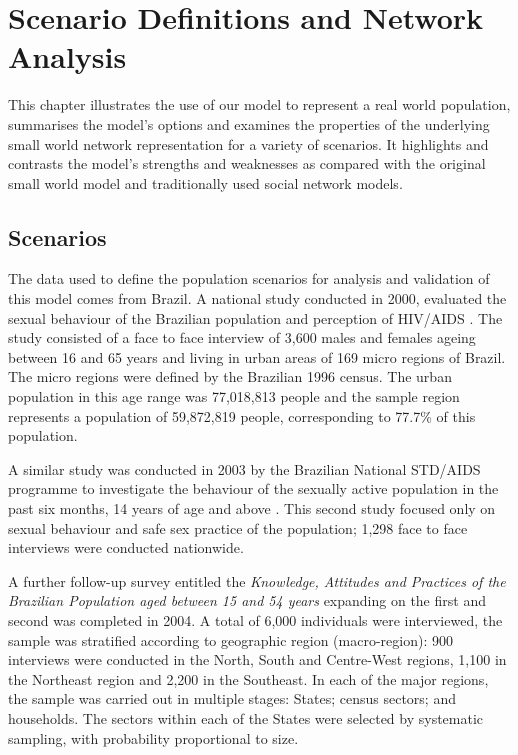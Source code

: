 
\chapter{Scenario Definitions and Network Analysis}\label{chpdata}

This chapter illustrates the use of our model to represent a real world population,
summarises the model's options and examines the properties of the underlying small world
network representation for a variety of scenarios. It highlights and contrasts the
model's strengths and weaknesses as compared with the original small world model
\cite{Watts1998} and traditionally used social network models.


\section{Scenarios}

The data used to define the population scenarios for analysis and validation of this
model comes from Brazil. A national study conducted in 2000, evaluated the sexual
behaviour of the Brazilian population and perception of HIV/AIDS \cite{msbrasil2000}. The
study consisted of a face to face interview of 3,600 males and females ageing between 16
and 65 years and living in urban areas of 169 micro regions of Brazil. The micro regions
were defined by the Brazilian 1996 census. The urban population in this age range was
77,018,813 people and the sample region represents a population of 59,872,819 people,
corresponding to 77.7\% of this population.

A similar study was conducted in 2003 by the Brazilian National STD/AIDS programme to
investigate the behaviour of the sexually active population in the past six months, 14
years of age and above \cite{msibope2003}. This second study focused only on sexual
behaviour and safe sex practice of the population; 1,298 face to face interviews were
conducted nationwide.

A further follow-up survey entitled the \emph{Knowledge, Attitudes and Practices of the
Brazilian Population aged between 15 and 54 years} \cite{Szwarcwald2004} expanding on the
first and second was completed in 2004. A total of 6,000 individuals were interviewed,
the sample was stratified according to geographic region (macro-region): 900 interviews
were conducted in the North, South and Centre-West regions, 1,100 in the Northeast region
and 2,200 in the Southeast. In each of the major regions, the sample was carried out in
multiple stages: States; census sectors; and households. The sectors within each of the
States were selected by systematic sampling, with probability proportional to size.

